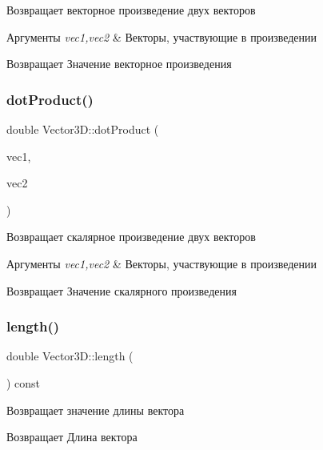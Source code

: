 Возвращает векторное произведение двух векторов 
\begin{DoxyParams}{Аргументы}
{\em vec1,vec2} & Векторы, участвующие в произведении \\
\hline
\end{DoxyParams}
\begin{DoxyReturn}{Возвращает}
Значение векторное произведения 
\end{DoxyReturn}
\mbox{\label{class_vector3_d_ac886e5b1f67b986be8c9557e83e19c52}} 
\subsubsection{\texorpdfstring{dot\+Product()}{dotProduct()}}
{\footnotesize\ttfamily double Vector3\+D\+::dot\+Product (\begin{DoxyParamCaption}\item[{const \mbox{\hyperlink{class_vector3_d}{Vector3D}} \&}]{vec1,  }\item[{const \mbox{\hyperlink{class_vector3_d}{Vector3D}} \&}]{vec2 }\end{DoxyParamCaption})\hspace{0.3cm}{\ttfamily [static]}}

Возвращает скалярное произведение двух векторов 
\begin{DoxyParams}{Аргументы}
{\em vec1,vec2} & Векторы, участвующие в произведении \\
\hline
\end{DoxyParams}
\begin{DoxyReturn}{Возвращает}
Значение скалярного произведения 
\end{DoxyReturn}
\mbox{\label{class_vector3_d_a4ddb90e85e10f0f32475725cb966a5ce}} 
\subsubsection{\texorpdfstring{length()}{length()}}
{\footnotesize\ttfamily double Vector3\+D\+::length (\begin{DoxyParamCaption}{ }\end{DoxyParamCaption}) const}

Возвращает значение длины вектора \begin{DoxyReturn}{Возвращает}
Длина вектора 
\end{DoxyReturn}
\mbox{\label{class_vector3_d_a07018ea108ca8aa4d64388fcb30b02bc}} 
